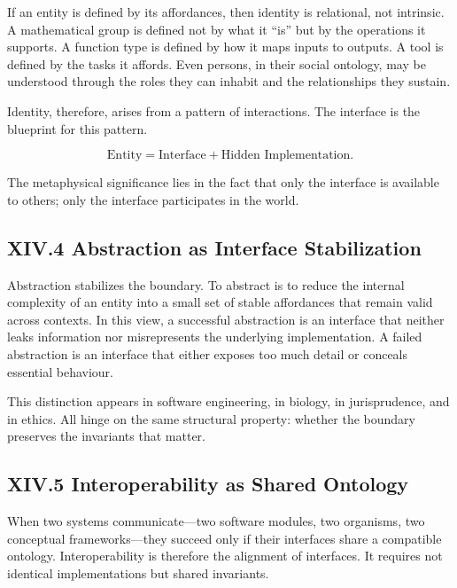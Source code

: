 \documentclass[12pt,letterpaper]{article}
\begin{document}
If an entity is defined by its affordances, then identity is relational, not intrinsic. A mathematical group is defined not by what it ``is'' but by the operations it supports. A function type is defined by how it maps inputs to outputs. A tool is defined by the tasks it affords. Even persons, in their social ontology, may be understood through the roles they can inhabit and the relationships they sustain.

Identity, therefore, arises from a pattern of interactions. The interface is the blueprint for this pattern.

\[
\text{Entity} = \text{Interface} + \text{Hidden Implementation}.
\]

The metaphysical significance lies in the fact that only the interface is available to others; only the interface participates in the world.

\subsection{XIV.4 Abstraction as Interface Stabilization}

Abstraction stabilizes the boundary. To abstract is to reduce the internal complexity of an entity into a small set of stable affordances that remain valid across contexts. In this view, a successful abstraction is an interface that neither leaks information nor misrepresents the underlying implementation. A failed abstraction is an interface that either exposes too much detail or conceals essential behaviour.

This distinction appears in software engineering, in biology, in jurisprudence, and in ethics. All hinge on the same structural property: whether the boundary preserves the invariants that matter.

\subsection{XIV.5 Interoperability as Shared Ontology}

When two systems communicate—two software modules, two organisms, two conceptual frameworks—they succeed only if their interfaces share a compatible ontology. Interoperability is therefore the alignment of interfaces. It requires not identical implementations but shared invariants.
\end{document}
